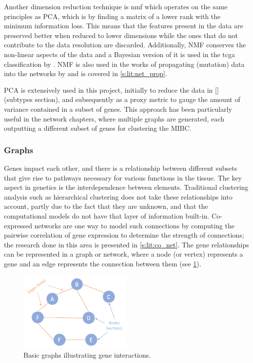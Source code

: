 Another dimension reduction technique is \acrfull{nmf} which operates on the same principles as PCA, which is by finding a matrix of a lower rank with the minimum information loss. This means that the features present in the data are preserved better when reduced to lower dimensions while the ones that do not contribute to the data resolution are discarded. Additionally, NMF conserves the non-linear aspects of the data and a Bayesian version of it is used in the \acrfull{tcga} classification by \citet{Robertson2017-mg}. NMF is also  used in the works of propagating (mutation) data into the networks by \citet{Yang2016-dm, Cai2008-fv} and is covered in \cref{s:lit:net_prop}.

PCA is extensively used in this project, initially to reduce the data in \ref{} (subtypes section), and subsequently as a proxy metric to gauge the amount of variance contained in a subset of genes. This approach has been particularly useful in the network chapters, where multiple graphs are generated, each outputting a different subset of genes for clustering the MIBC.


\subsubsection{Graphs} \label{s:lit:graph_overview}

Genes impact each other, and there is a relationship between different subsets that give rise to pathways necessary for various functions in the tissue. The key aspect in genetics is the interdependence between elements. Traditional clustering analysis such as hierarchical clustering does not take these relationships into account, partly due to the fact that they are unknown, and that the computational models do not have that layer of information built-in. Co-expressed networks are one way to model such connections by computing the pairwise correlation of gene expression to determine the strength of connections; the research done in this area is presented in \cref{s:lit:co_net}. The gene relationships can be represented in a graph or network, where a node (or vertex) represents a gene and an edge represents the connection between them (see \cref{fig:graphs_basic}).

\begin{figure}[!htb]
  \centering\includegraphics[width=0.5\textwidth,height=0.5\textheight,keepaspectratio]{Sections/Lit_review/Resources/basic_graphs.png}
    \caption{Basic graphs illustrating gene interactions.}
    \label{fig:graphs_basic}
\end{figure}

